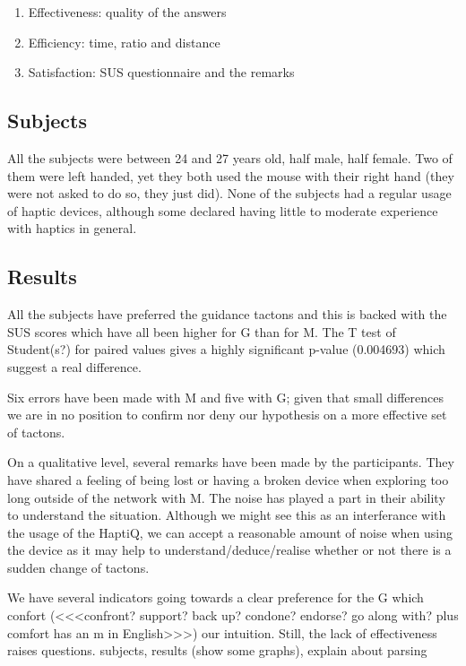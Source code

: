 \begin{enumerate}
\def\labelenumi{\arabic{enumi}.}
\item
  Effectiveness: quality of the answers
\item
  Efficiency: time, ratio and distance
\item
  Satisfaction: SUS questionnaire and the remarks
\end{enumerate}

\subsection{Subjects}\label{subjects}

All the subjects were between 24 and 27 years old, half male, half female. Two of them were left handed, yet they both used the mouse with their right hand (they were not asked to do so, they just did). None of the subjects had a regular usage of haptic devices, although some declared having little to moderate experience with haptics in general.

\subsection{Results}\label{results}

All the subjects have preferred the guidance tactons and this is backed with the SUS scores which have all been higher for G than for M. The T test of Student(s?) for paired values gives a highly significant p-value (0.004693) which suggest a real difference.

Six errors have been made with M and five with G; given that small differences we are in no position to confirm nor deny our hypothesis on a more effective set of tactons.

On a qualitative level, several remarks have been made by the participants. They have shared a feeling of being lost or having a broken device when exploring too long outside of the network with M. The noise has played a part in their ability to understand the situation.
Although we might see this as an interferance with the usage of the HaptiQ, we can accept a reasonable amount of noise when using the device as it may help to understand/deduce/realise whether or not there is a sudden change of
tactons.

We have several indicators going towards a clear preference for the G which confort (<<<confront? support? back up? condone? endorse? go along with? plus comfort has an m in English>>>) our intuition. Still, the lack of effectiveness raises questions. 
subjects, results (show some graphs), explain about parsing

